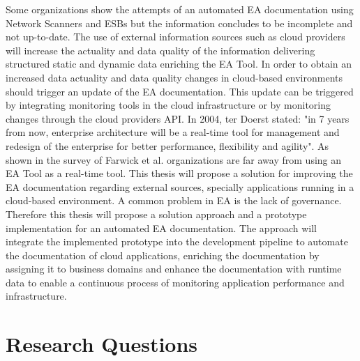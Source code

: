 Some organizations show the attempts of an automated EA documentation using Network Scanners and ESBs but the information concludes to be incomplete and not up-to-date. 
The use of external information sources such as cloud providers will increase the actuality and data quality of the information delivering structured static and dynamic data enriching the EA Tool. In order to obtain an increased data actuality and data quality changes in cloud-based environments should trigger an update of the EA documentation. This update can be triggered by integrating monitoring tools in the cloud infrastructure or by monitoring changes through the cloud providers API.
In 2004, ter Doerst stated: "in 7 years from now, enterprise architecture will be a real-time tool for management and redesign of the enterprise for better performance, flexibility and agility". \cite{TerDoest2014}
As shown in the survey of Farwick et al. \cite{Farwick2013} organizations are far away from using an EA Tool as a real-time tool. This thesis will propose a solution for improving the EA documentation regarding external sources, specially applications running in a cloud-based environment. A common problem in EA is the lack of governance. Therefore this thesis will propose a solution approach and a prototype implementation for an automated EA documentation. The approach will integrate the implemented prototype into the development pipeline to automate the documentation of cloud applications, enriching the documentation by assigning it to business domains and enhance the documentation with runtime data to enable a continuous process of monitoring application performance and infrastructure.



\section{Research Questions}\label{section:researchquestions}

